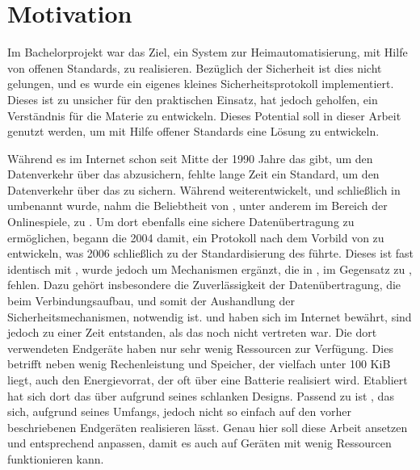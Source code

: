 \section{Motivation}
Im Bachelorprojekt  war das Ziel, ein System zur Heimautomatisierung, mit Hilfe von offenen Standards, zu realisieren.
Bezüglich der Sicherheit ist dies nicht gelungen, und es wurde ein eigenes kleines Sicherheitsprotokoll implementiert. Dieses ist
zu unsicher für den praktischen Einsatz, hat jedoch geholfen, ein Verständnis für die Materie zu entwickeln.
Dieses Potential soll in dieser Arbeit genutzt werden, um mit Hilfe offener Standards eine Lösung zu entwickeln.

Während es im Internet schon seit Mitte der 1990 Jahre das  gibt, um den Datenverkehr
über das  abzusichern, fehlte lange Zeit ein Standard, um den Datenverkehr über das  zu sichern.
Während  weiterentwickelt, und schließlich in  \cite{rfc5246} umbenannt wurde, nahm die
Beliebtheit von , unter anderem im Bereich der Onlinespiele, zu \cite[Kapitel 1]{rfc6347}. Um dort ebenfalls
eine sichere Datenübertragung zu ermöglichen, begann die  2004 damit, ein Protokoll nach dem Vorbild von  zu entwickeln,
was 2006 schließlich zu der Standardisierung des  \cite{rfc6347} führte. Dieses ist fast identisch mit , wurde jedoch um
Mechanismen ergänzt, die in , im Gegensatz zu , fehlen. Dazu gehört insbesondere die Zuverlässigkeit der Datenübertragung,
die beim Verbindungsaufbau, und somit der Aushandlung der Sicherheitsmechanismen, notwendig ist.  und  haben sich im Internet
bewährt, sind jedoch zu einer Zeit entstanden, als das  noch nicht vertreten war. Die dort verwendeten Endgeräte haben nur sehr wenig
Ressourcen zur Verfügung. Dies betrifft neben wenig Rechenleistung und Speicher, der vielfach unter 100 KiB liegt, auch den Energievorrat, der
oft über eine Batterie realisiert wird. Etabliert hat sich dort das  \cite{draftcoap13} über  aufgrund seines schlanken Designs.
Passend zu  ist , das sich, aufgrund seines Umfangs, jedoch nicht so einfach auf den vorher beschriebenen Endgeräten realisieren
lässt. Genau hier soll diese Arbeit ansetzen und  entsprechend anpassen, damit es auch auf Geräten mit wenig Ressourcen funktionieren kann.